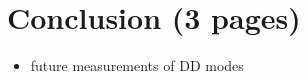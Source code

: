 
\chapter{Conclusion (3 pages)}
\label{sec:conclusion}

\begin{itemize}
	\item future \lhcb measurements of DD modes
\end{itemize}
